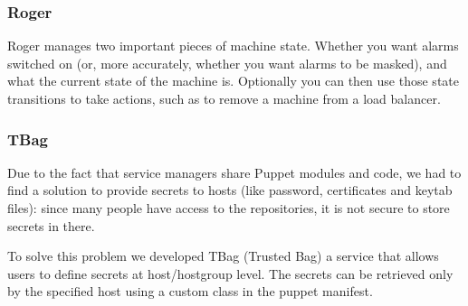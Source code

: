 \subsubsection{Roger}

Roger manages two important pieces of machine state. Whether you want
alarms switched on (or, more accurately, whether you want alarms to be
masked), and what the current state of the machine is. Optionally you can
then use those state transitions to take actions, such as to remove
a machine from a load balancer.

\subsubsection{TBag}

Due to the fact that service managers share Puppet modules and code, we
had to find a solution to provide secrets to hosts (like password,
certificates and keytab files): since many people have access to the
repositories, it is not secure to store secrets in there.

To solve this problem we developed TBag (Trusted Bag) a service that
allows users to define secrets at host/hostgroup level. The secrets can be
retrieved only by the specified host using a custom class in the puppet
manifest.


